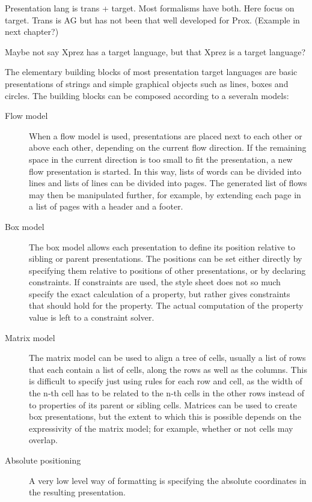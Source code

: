 Presentation lang is trans + target. Most formalisms have both. Here focus on target. Trans is AG but has not been that well developed for Prox. (Example in next chapter?)

Maybe not say Xprez has a target language, but that Xprez is a target language?



The elementary building blocks of most presentation target languages are basic presentations of strings and simple graphical objects such as lines, boxes and circles. The building blocks can be composed according to a severaln models:

\begin{description}
\item[Flow model]
When a flow model is used, presentations are placed next to each other or above each other, depending on the current flow direction. If the remaining space in the current direction is too small to fit the presentation, a new flow presentation is started. In this way, lists of words can be divided into lines and lists of lines can be divided into pages. The generated list of flows may then be manipulated further, for example, by extending each page in a list of pages with a header and a footer.
\item[Box model]
The box model allows each presentation to define its position relative to sibling or parent presentations. The positions can be set either directly by specifying them relative to positions of other presentations, or by declaring constraints. If constraints are used, the style sheet does not so much specify the exact calculation of a property, but rather gives constraints that should hold for the property. The actual computation of the property value is left to a constraint solver. 
\item[Matrix model]
The matrix model can be used to align a tree of cells, usually a list of rows that each contain a list of cells, along the rows as well as the columns. This is difficult to specify just using rules for each row and cell, as the width of the n-th cell has to be related to the n-th cells in the other rows instead of to properties of its parent or sibling cells. Matrices can be used to create box presentations, but the extent to which this is possible depends on the expressivity of the matrix model; for example, whether or not cells may overlap.
\item[Absolute positioning]
A very low level way of formatting is specifying the absolute coordinates in the resulting presentation.
\end{description}


